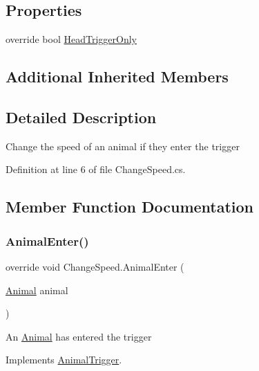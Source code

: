 \subsection*{Properties}
\begin{DoxyCompactItemize}
\item 
override bool \mbox{\hyperlink{class_change_speed_ac9a7eb2aaa6053d3a08f7a0c3bc590a7}{Head\+Trigger\+Only}}
\end{DoxyCompactItemize}
\subsection*{Additional Inherited Members}


\subsection{Detailed Description}
Change the speed of an animal if they enter the trigger 



Definition at line 6 of file Change\+Speed.\+cs.



\subsection{Member Function Documentation}
\mbox{\label{class_change_speed_ae31f3a37d9eca8f2d055867035e02ca4}} 
\subsubsection{\texorpdfstring{Animal\+Enter()}{AnimalEnter()}}
{\footnotesize\ttfamily override void Change\+Speed.\+Animal\+Enter (\begin{DoxyParamCaption}\item[{\mbox{\hyperlink{class_animal}{Animal}}}]{animal }\end{DoxyParamCaption})\hspace{0.3cm}{\ttfamily [virtual]}}



An \mbox{\hyperlink{class_animal}{Animal}} has entered the trigger 



Implements \mbox{\hyperlink{class_animal_trigger_a03181803fa268e0bfcbdc752ee733c40}{Animal\+Trigger}}.



